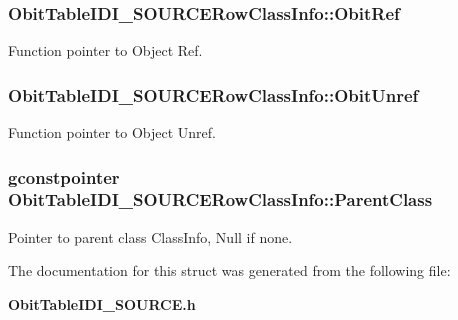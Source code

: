 \subsubsection{ {\bf Obit\-Table\-IDI\_\-SOURCERow\-Class\-Info::Obit\-Ref}}\label{structObitTableIDI__SOURCERowClassInfo_o10}


Function pointer to Object Ref. 

\subsubsection{ {\bf Obit\-Table\-IDI\_\-SOURCERow\-Class\-Info::Obit\-Unref}}\label{structObitTableIDI__SOURCERowClassInfo_o11}


Function pointer to Object Unref. 

\subsubsection{\setlength{\rightskip}{0pt plus 5cm}gconstpointer {\bf Obit\-Table\-IDI\_\-SOURCERow\-Class\-Info::Parent\-Class}}\label{structObitTableIDI__SOURCERowClassInfo_o3}


Pointer to parent class Class\-Info, Null if none. 



The documentation for this struct was generated from the following file:\begin{CompactItemize}
\item 
{\bf Obit\-Table\-IDI\_\-SOURCE.h}\end{CompactItemize}
